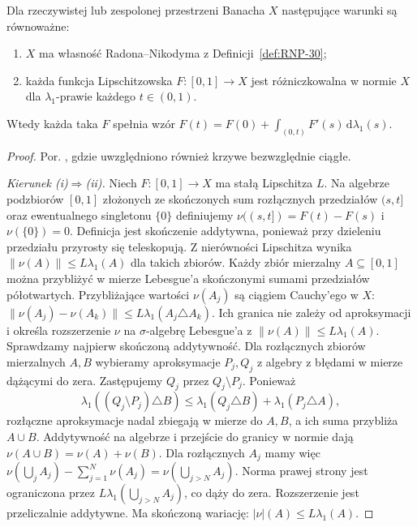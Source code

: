 \begin{twierdzenie}
\label{thm:rnp-lipschitz-equiv-30}
Dla rzeczywistej lub zespolonej przestrzeni Banacha $X$
następujące warunki są równoważne:
\begin{enumerate}[label=(\roman*)]
 \item $X$ ma własność Radona--Nikodyma z
       Definicji~\ref{def:RNP-30};
 \item każda funkcja Lipschitzowska
       $F:[0,1]\to X$ jest różniczkowalna w normie $X$
       dla $\lambda_1$-prawie każdego $t\in(0,1)$.
\end{enumerate}
Wtedy każda taka $F$ spełnia wzór
$F(t)=F(0)+\int_{(0,t)}F'(s)\,\mathrm d\lambda_1(s)$.
\end{twierdzenie}
\begin{proof}
Por. , gdzie uwzględniono również krzywe bezwzględnie ciągłe.

\emph{Kierunek (i)$\Rightarrow$(ii).}
Niech $F:[0,1]\to X$ ma stałą Lipschitza $L$.
Na algebrze podzbiorów $[0,1]$ złożonych ze
skończonych sum rozłącznych przedziałów $(s,t]$
oraz ewentualnego singletonu $\{0\}$ definiujemy
$\nu((s,t])=F(t)-F(s)$ i $\nu(\{0\})=0$. Definicja jest skończenie
addytywna, ponieważ przy dzieleniu przedziału przyrosty
się teleskopują. Z nierówności Lipschitza wynika
$\|\nu(A)\|\le L\lambda_1(A)$ dla takich zbiorów.
Każdy zbiór mierzalny $A\subseteq[0,1]$ można
przybliżyć w mierze Lebesgue'a skończonymi sumami
przedziałów półotwartych. Przybliżające wartości
$\nu(A_j)$ są ciągiem Cauchy'ego w $X$:
$\|\nu(A_j)-\nu(A_k)\|\le L\lambda_1(A_j\triangle A_k)$.
Ich granica nie zależy od aproksymacji i określa
rozszerzenie $\nu$ na $\sigma$-algebrę Lebesgue'a z
$\|\nu(A)\|\le L\lambda_1(A)$. Sprawdzamy najpierw skończoną addytywność.
Dla rozłącznych zbiorów mierzalnych $A,B$ wybieramy
aproksymacje $P_j,Q_j$ z algebry z błędami w mierze
dążącymi do zera. Zastępujemy $Q_j$ przez $Q_j\setminus P_j$.
Ponieważ
\[
 \lambda_1((Q_j\setminus P_j)\triangle B)
 \le\lambda_1(Q_j\triangle B)+\lambda_1(P_j\triangle A),
\]
rozłączne aproksymacje nadal zbiegają w mierze
do $A,B$, a ich suma przybliża $A\cup B$.
Addytywność na algebrze i przejście do granicy w normie
dają $\nu(A\cup B)=\nu(A)+\nu(B)$.
Dla rozłącznych $A_j$ mamy więc
$\nu(\bigcup_jA_j)-\sum_{j=1}^N\nu(A_j)
=\nu(\bigcup_{j>N}A_j)$. Norma prawej strony
jest ograniczona przez $L\lambda_1(\bigcup_{j>N}A_j)$,
co dąży do zera. Rozszerzenie jest przeliczalnie addytywne. Ma skończoną wariację:
$|\nu|(A)\le L\lambda_1(A)$.


\end{proof}
